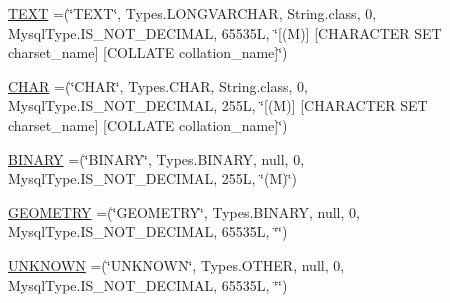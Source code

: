 \begin{DoxyCompactItemize}
\item 
\mbox{\hyperlink{enumcom_1_1mysql_1_1cj_1_1_mysql_type_af97147cd8d895153093d3ba21bf44007}{T\+E\+XT}} =(\char`\"{}T\+E\+XT\char`\"{}, Types.\+L\+O\+N\+G\+V\+A\+R\+C\+H\+AR, String.\+class, 0, Mysql\+Type.\+I\+S\+\_\+\+N\+O\+T\+\_\+\+D\+E\+C\+I\+M\+AL, 65535\+L, \char`\"{}\mbox{[}(\+M)\mbox{]} \mbox{[}\+C\+H\+A\+R\+A\+C\+T\+E\+R S\+E\+T charset\+\_\+name\mbox{]} \mbox{[}\+C\+O\+L\+L\+A\+T\+E collation\+\_\+name\mbox{]}\char`\"{})
\item 
\mbox{\hyperlink{enumcom_1_1mysql_1_1cj_1_1_mysql_type_a7bcb1882ce4e4d44421d877d3f1f64a9}{C\+H\+AR}} =(\char`\"{}C\+H\+AR\char`\"{}, Types.\+C\+H\+AR, String.\+class, 0, Mysql\+Type.\+I\+S\+\_\+\+N\+O\+T\+\_\+\+D\+E\+C\+I\+M\+AL, 255\+L, \char`\"{}\mbox{[}(\+M)\mbox{]} \mbox{[}\+C\+H\+A\+R\+A\+C\+T\+E\+R S\+E\+T charset\+\_\+name\mbox{]} \mbox{[}\+C\+O\+L\+L\+A\+T\+E collation\+\_\+name\mbox{]}\char`\"{})
\item 
\mbox{\hyperlink{enumcom_1_1mysql_1_1cj_1_1_mysql_type_ac5a30a348c2d7efaefa81040b53513a7}{B\+I\+N\+A\+RY}} =(\char`\"{}B\+I\+N\+A\+RY\char`\"{}, Types.\+B\+I\+N\+A\+RY, null, 0, Mysql\+Type.\+I\+S\+\_\+\+N\+O\+T\+\_\+\+D\+E\+C\+I\+M\+AL, 255\+L, \char`\"{}(\+M)\char`\"{})
\item 
\mbox{\hyperlink{enumcom_1_1mysql_1_1cj_1_1_mysql_type_aa49cdfb7c144fe5dcf23fe5c31bfe82d}{G\+E\+O\+M\+E\+T\+RY}} =(\char`\"{}G\+E\+O\+M\+E\+T\+RY\char`\"{}, Types.\+B\+I\+N\+A\+RY, null, 0, Mysql\+Type.\+I\+S\+\_\+\+N\+O\+T\+\_\+\+D\+E\+C\+I\+M\+AL, 65535\+L, \char`\"{}\char`\"{})
\item 
\mbox{\hyperlink{enumcom_1_1mysql_1_1cj_1_1_mysql_type_a5c1f5a756ee4ef0468c1782e0f2bec65}{U\+N\+K\+N\+O\+WN}} =(\char`\"{}U\+N\+K\+N\+O\+WN\char`\"{}, Types.\+O\+T\+H\+ER, null, 0, Mysql\+Type.\+I\+S\+\_\+\+N\+O\+T\+\_\+\+D\+E\+C\+I\+M\+AL, 65535\+L, \char`\"{}\char`\"{})
\end{DoxyCompactItemize}
